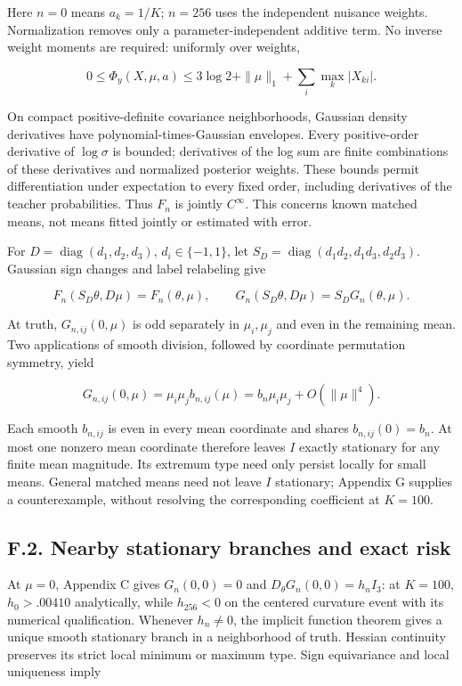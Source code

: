 \documentclass{article}
\begin{document}
Here \(n=0\) means \(a_k=1/K\); \(n=256\) uses the independent nuisance
weights. Normalization removes only a parameter-independent additive
term. No inverse weight moments are required: uniformly over weights,

\[
0\le\Phi_y(X,\mu,a)\le3\log2+\|\mu\|_1+\sum_i\max_k|X_{ki}|.
\tag{F.2}
\]

On compact positive-definite covariance neighborhoods, Gaussian density
derivatives have polynomial-times-Gaussian envelopes. Every
positive-order derivative of \(\log\sigma\) is bounded; derivatives of
the log sum are finite combinations of these derivatives and normalized
posterior weights. These bounds permit differentiation under expectation
to every fixed order, including derivatives of the teacher
probabilities. Thus \(F_n\) is jointly \(C^\infty\). This concerns known
matched means, not means fitted jointly or estimated with error.

For \(D=\operatorname{diag}(d_1,d_2,d_3)\), \(d_i\in\{-1,1\}\), let
\(S_D=\operatorname{diag}(d_1d_2,d_1d_3,d_2d_3)\). Gaussian sign changes
and label relabeling give

\[
F_n(S_D\theta,D\mu)=F_n(\theta,\mu),\qquad
G_n(S_D\theta,D\mu)=S_DG_n(\theta,\mu).
\tag{F.3}
\]

At truth, \(G_{n,ij}(0,\mu)\) is odd separately in \(\mu_i,\mu_j\) and
even in the remaining mean. Two applications of smooth division,
followed by coordinate permutation symmetry, yield

\[
G_{n,ij}(0,\mu)=\mu_i\mu_jb_{n,ij}(\mu)
=b_n\mu_i\mu_j+O(\|\mu\|^4).
\tag{F.4}
\]

Each smooth \(b_{n,ij}\) is even in every mean coordinate and shares
\(b_{n,ij}(0)=b_n\). At most one nonzero mean coordinate therefore
leaves \(I\) exactly stationary for any finite mean magnitude. Its
extremum type need only persist locally for small means. General matched
means need not leave \(I\) stationary; Appendix G supplies a
counterexample, without resolving the corresponding coefficient at
\(K=100\).

\subsection*{F.2. Nearby stationary branches and exact
risk}\label{f.2.-nearby-stationary-branches-and-exact-risk}

At \(\mu=0\), Appendix C gives \(G_n(0,0)=0\) and
\(D_\theta G_n(0,0)=h_nI_3\): at \(K=100\), \(h_0>.00410\) analytically,
while \(h_{256}<0\) on the centered curvature event with its numerical
qualification. Whenever \(h_n\ne0\), the implicit function theorem gives
a unique smooth stationary branch in a neighborhood of truth. Hessian
continuity preserves its strict local minimum or maximum type. Sign
equivariance and local uniqueness imply
\end{document}

